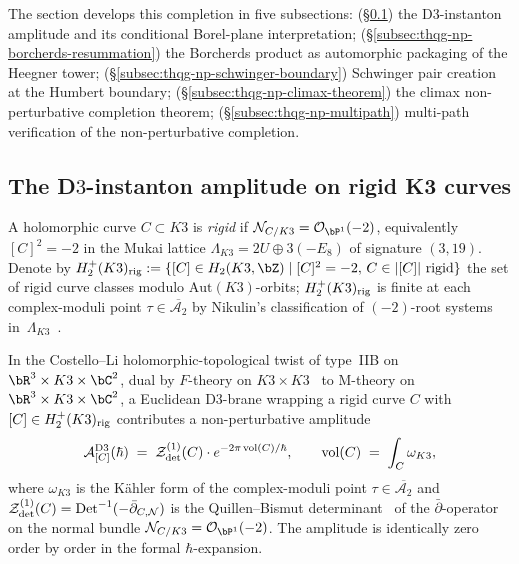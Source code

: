 The section develops this completion in five subsections:
(\S\ref{subsec:thqg-np-d3-instanton}) the D$3$-instanton amplitude and
its conditional Borel-plane interpretation;
(\S\ref{subsec:thqg-np-borcherds-resummation}) the Borcherds product
as automorphic packaging of the Heegner tower;
(\S\ref{subsec:thqg-np-schwinger-boundary}) Schwinger pair creation at
the Humbert boundary;
(\S\ref{subsec:thqg-np-climax-theorem}) the climax non-perturbative
completion theorem;
(\S\ref{subsec:thqg-np-multipath}) multi-path verification of the
non-perturbative completion.

\subsection{The D\texorpdfstring{$3$}{3}-instanton amplitude on rigid K3 curves}
\label{subsec:thqg-np-d3-instanton}

\begin{definition}
\label{def:thqg-np-rigid-curve}
A holomorphic curve $C\subset K3$ is \emph{rigid} if
$\mathcal{N}_{C/K3} = \mathcal{O}_{\bP^1}(-2)$, equivalently
$[C]^2 = -2$ in the Mukai lattice $\Lambda_{K3} = 2U\oplus 3(-E_8)$
of signature $(3, 19)$. Denote by
$H_2^+(K3)_{\rig} := \{[C]\in H_2(K3,\bZ)\mid [C]^2 = -2,\,C\in|[C]|\text{ rigid}\}$
the set of rigid curve classes modulo $\mathrm{Aut}(K3)$-orbits;
$H_2^+(K3)_{\mathrm{rig}}$ is finite at each complex-moduli point
$\tau\in\overline{\mathcal{A}_2}$ by Nikulin's classification of
$(-2)$-root systems
in~$\Lambda_{K3}$~\cite[Thm.~1.12.2]{Nikulin1980}.
\end{definition}

\begin{proposition}
\label{prop:thqg-np-d3-amplitude}
In the Costello--Li holomorphic-topological twist of type~IIB on
$\bR^3\times K3\times\bC^2$, dual by $F$-theory on
$K3\times K3$~\cite[\S 2]{Vafa1996F} to M-theory on
$\bR^3\times K3\times\bC^2$, a Euclidean D$3$-brane wrapping a rigid
curve $C$ with $[C]\in H_2^+(K3)_{\mathrm{rig}}$ contributes a
non-perturbative amplitude
\begin{equation}\label{eq:thqg-np-d3-amp}
 \mathcal{A}^{\mathrm{D3}}_{[C]}(\hbar)
 \;=\; \mathcal{Z}^{(1)}_{\det}(C)\cdot e^{-2\pi\operatorname{vol}(C)/\hbar},
 \qquad \operatorname{vol}(C) \;=\; \int_C\omega_{K3},
\end{equation}
where $\omega_{K3}$ is the K\"ahler form of the complex-moduli point
$\tau\in\overline{\mathcal{A}_2}$ and
$\mathcal{Z}^{(1)}_{\det}(C) = \operatorname{Det}^{-1}(-\bar\partial_{C,\mathcal{N}})$
is the Quillen--Bismut determinant~\cite[\S 7]{BismutGilletSoule1988}
of the $\bar\partial$-operator on the normal bundle
$\mathcal{N}_{C/K3} = \mathcal{O}_{\bP^1}(-2)$. The amplitude is
identically zero order by order in the formal $\hbar$-expansion.
\end{proposition}

